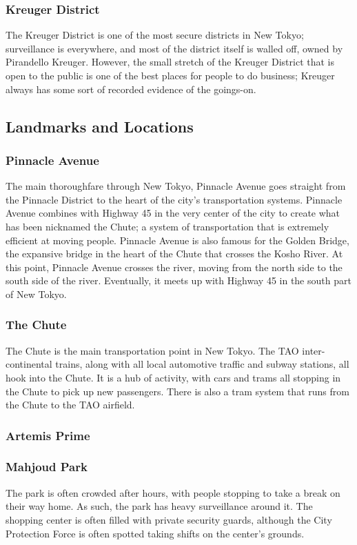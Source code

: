 \documentclass{article}
\begin{document}
\subsubsection{Kreuger District}
The Kreuger District is one of the most secure districts in New Tokyo;
surveillance is everywhere, and most of the district itself is walled off,
owned by Pirandello Kreuger. However, the small stretch of the Kreuger District
that is open to the public is one of the best places for people to do business;
Kreuger always has some sort of recorded evidence of the goings-on.
\subsection{Landmarks and Locations}
\subsubsection{Pinnacle Avenue}
The main thoroughfare through New Tokyo, Pinnacle Avenue goes straight from the
Pinnacle District to the heart of the city’s transportation systems. Pinnacle Avenue combines with Highway 45 in the very center of the city to create what has been nicknamed the Chute; a system of transportation that is extremely efficient at moving people. Pinnacle Avenue is also famous for the Golden Bridge, the expansive bridge in the heart of the Chute that crosses the Kosho River. At this point, Pinnacle Avenue crosses the river, moving from the north side to the south side of the river. Eventually, it meets up with Highway 45 in the south part of New Tokyo.
\subsubsection{The Chute}
The Chute is the main transportation point in New Tokyo. The TAO
inter-continental trains, along with all local automotive traffic and subway stations, all hook into the Chute. It is a hub of activity, with cars and trams all stopping in the Chute to pick up new passengers. There is also a tram system that runs from the Chute to the TAO airfield.
\subsubsection{Artemis Prime}
\subsubsection{Mahjoud Park}
The park is often crowded after hours, with people stopping to take a break on
their way home. As such, the park has heavy surveillance around it. The shopping center is often filled with private security guards, although the City Protection Force is often spotted taking shifts on the center’s grounds.
\end{document}
